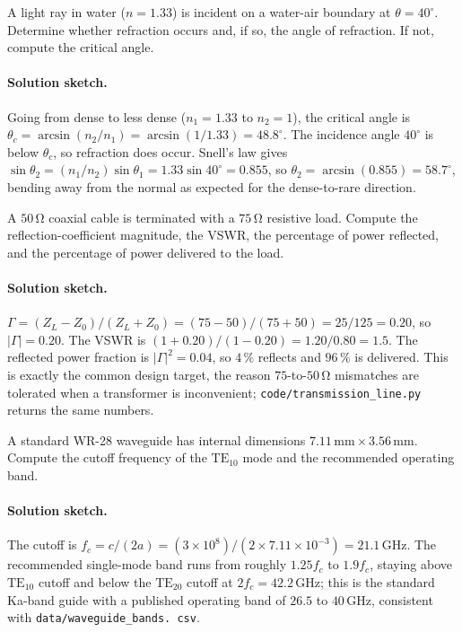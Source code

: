 \begin{exercise}
A light ray in water ($n = 1.33$) is incident on a water-air boundary
at $\theta = 40^{\circ}$. Determine whether refraction occurs and, if
so, the angle of refraction. If not, compute the critical angle.
\paragraph{Solution sketch.} Going from dense to less dense ($n_{1} =
1.33$ to $n_{2} = 1$), the critical angle is $\theta_{c} = \arcsin(n_{2}
/n_{1}) = \arcsin(1/1.33) = 48.8^{\circ}$. The incidence angle
$40^{\circ}$ is below $\theta_{c}$, so refraction does occur. Snell's
law gives $\sin\theta_{2} = (n_{1}/n_{2})\sin\theta_{1} = 1.33\sin
40^{\circ} = 0.855$, so $\theta_{2} = \arcsin(0.855) = 58.7^{\circ}$,
bending away from the normal as expected for the dense-to-rare
direction.
\end{exercise}

\begin{exercise}
A $50\,\si{\ohm}$ coaxial cable is terminated with a $75\,\si{\ohm}$
resistive load. Compute the reflection-coefficient magnitude, the
VSWR, the percentage of power reflected, and the percentage of power
delivered to the load.
\paragraph{Solution sketch.} $\Gamma = (Z_{L}-Z_{0})/(Z_{L}+Z_{0}) =
(75-50)/(75+50) = 25/125 = 0.20$, so $|\Gamma| = 0.20$. The VSWR is
$(1+0.20)/(1-0.20) = 1.20/0.80 = 1.5$. The reflected power fraction is
$|\Gamma|^{2} = 0.04$, so $4\,\%$ reflects and $96\,\%$ is delivered.
This is exactly the common design target, the reason $75$-to-$50\,\si{
\ohm}$ mismatches are tolerated when a transformer is inconvenient;
\texttt{code/transmission\_line.py} returns the same numbers.
\end{exercise}

\begin{exercise}
A standard WR-28 waveguide has internal dimensions $7.11\,\si{\milli
\meter}\times 3.56\,\si{\milli\meter}$. Compute the cutoff frequency
of the $\text{TE}_{10}$ mode and the recommended operating band.
\paragraph{Solution sketch.} The cutoff is $f_{c} = c/(2a) = (3\times
10^{8})/(2\times 7.11\times 10^{-3}) = 21.1\,\si{\giga\hertz}$. The
recommended single-mode band runs from roughly $1.25 f_{c}$ to $1.9
f_{c}$, staying above $\text{TE}_{10}$ cutoff and below the
$\text{TE}_{20}$ cutoff at $2 f_{c} = 42.2\,\si{\giga\hertz}$; this is
the standard Ka-band guide with a published operating band of $26.5$ to
$40\,\si{\giga\hertz}$, consistent with \texttt{data/waveguide\_bands.
csv}.
\end{exercise}

